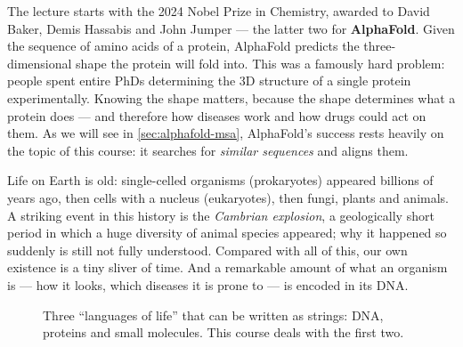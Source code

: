 \documentclass[11pt, oneside]{book}
\begin{document}
The lecture starts with the 2024 Nobel Prize in Chemistry, awarded to David
Baker, Demis Hassabis and John Jumper --- the latter two for
\textbf{AlphaFold}. Given the sequence of amino acids of a protein,
AlphaFold predicts the three-dimensional shape the protein will fold into.
This was a famously hard problem: people spent entire PhDs determining the 3D
structure of a single protein experimentally. Knowing the shape matters,
because the shape determines what a protein does --- and therefore how
diseases work and how drugs could act on them. As we will see in
\cref{sec:alphafold-msa}, AlphaFold's success rests heavily on the topic of
this course: it searches for \emph{similar sequences} and aligns them.

Life on Earth is old: single-celled organisms (prokaryotes) appeared
billions of years ago, then cells with a nucleus (eukaryotes), then fungi,
plants and animals. A striking event in this history is the \emph{Cambrian
explosion}, a geologically short period in which a huge diversity of animal
species appeared; why it happened so suddenly is still not fully understood.
Compared with all of this, our own existence is a tiny sliver of time. And a
remarkable amount of what an organism is --- how it looks, which diseases it
is prone to --- is encoded in its DNA.

\begin{figure}[htbp]
\centering
{}
\caption{Three ``languages of life'' that can be written as strings: DNA,
proteins and small molecules. This course deals with the first two.}
\label{fig:languages}
\end{figure}
\end{document}

